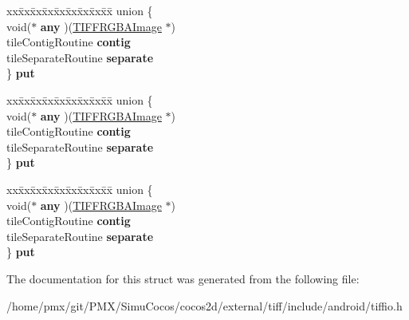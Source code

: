 \begin{DoxyCompactItemize}
\begin{tabbing}
\end{tabbing}\item 
\mbox{\label{struct__TIFFRGBAImage_aadc3b48f997658aad3ec47d96af8a2a4}} 
\begin{tabbing}
xx\=xx\=xx\=xx\=xx\=xx\=xx\=xx\=xx\=\kill
union \{\\
\>void($\ast$ {\bfseries any} )(\hyperlink{struct__TIFFRGBAImage}{TIFFRGBAImage} $\ast$)\\
\>tileContigRoutine {\bfseries contig}\\
\>tileSeparateRoutine {\bfseries separate}\\
\} {\bfseries put}\\

\end{tabbing}\item 
\mbox{\label{struct__TIFFRGBAImage_a4b27260985a7906857c69371c537c093}} 
\begin{tabbing}
xx\=xx\=xx\=xx\=xx\=xx\=xx\=xx\=xx\=\kill
union \{\\
\>void($\ast$ {\bfseries any} )(\hyperlink{struct__TIFFRGBAImage}{TIFFRGBAImage} $\ast$)\\
\>tileContigRoutine {\bfseries contig}\\
\>tileSeparateRoutine {\bfseries separate}\\
\} {\bfseries put}\\

\end{tabbing}\item 
\mbox{\label{struct__TIFFRGBAImage_a95e913f9a9013cc74e44bb7db9f0c6b7}} 
\begin{tabbing}
xx\=xx\=xx\=xx\=xx\=xx\=xx\=xx\=xx\=\kill
union \{\\
\>void($\ast$ {\bfseries any} )(\hyperlink{struct__TIFFRGBAImage}{TIFFRGBAImage} $\ast$)\\
\>tileContigRoutine {\bfseries contig}\\
\>tileSeparateRoutine {\bfseries separate}\\
\} {\bfseries put}\\

\end{tabbing}\end{DoxyCompactItemize}


The documentation for this struct was generated from the following file\+:\begin{DoxyCompactItemize}
\item 
/home/pmx/git/\+P\+M\+X/\+Simu\+Cocos/cocos2d/external/tiff/include/android/tiffio.\+h\end{DoxyCompactItemize}
